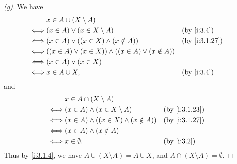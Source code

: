 \begin{proof}[(g)]
  We have
  \begin{align*}
         & x \in A \cup (X \setminus A)                                                      \\
    \iff & (x \in A) \lor (x \in X \setminus A)                           &  & \by{i:3.4}    \\
    \iff & (x \in A) \lor ((x \in X) \land (x \notin A))                  &  & \by{i:3.1.27} \\
    \iff & ((x \in A) \lor (x \in X)) \land ((x \in A) \lor (x \notin A))                    \\
    \iff & (x \in A) \lor (x \in X)                                                          \\
    \iff & x \in A \cup X,                                                &  & \by{i:3.4}
  \end{align*}
  and
  \begin{align*}
         & x \in A \cap (X \setminus A)                                      \\
    \iff & (x \in A) \land (x \in X \setminus A)          &  & \by{i:3.1.23} \\
    \iff & (x \in A) \land ((x \in X) \land (x \notin A)) &  & \by{i:3.1.27} \\
    \iff & (x \in A) \land (x \notin A)                                      \\
    \iff & x \in \emptyset.                               &  & \by{i:3.2}
  \end{align*}
  Thus by \cref{i:3.1.4}, we have \(A \cup (X \setminus A) = A \cup X\), and \(A \cap (X \setminus A) = \emptyset\).
\end{proof}

